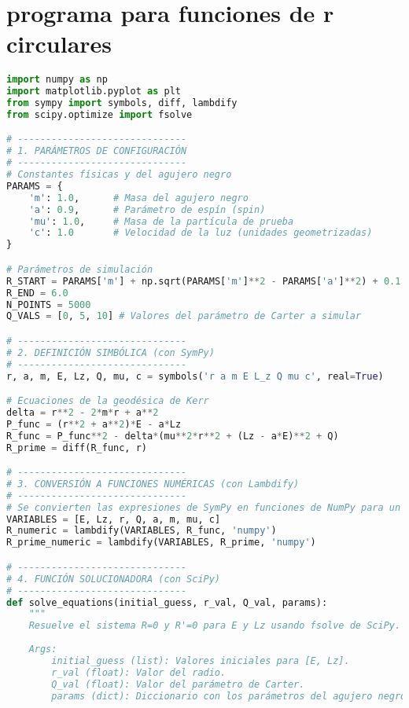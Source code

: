 \section{programa para funciones de r circulares}
\label{chap:programa_orbitas_circulares_kerr}

\begin{lstlisting}[language=Python, caption={Cálculo numérico de las constantes para órbitas circulares en Kerr}, label={lst:kerr_circular_orbits}]
import numpy as np
import matplotlib.pyplot as plt
from sympy import symbols, diff, lambdify
from scipy.optimize import fsolve

# ------------------------------
# 1. PARÁMETROS DE CONFIGURACIÓN
# ------------------------------
# Constantes físicas y del agujero negro
PARAMS = {
    'm': 1.0,      # Masa del agujero negro
    'a': 0.9,      # Parámetro de espín (spin)
    'mu': 1.0,     # Masa de la partícula de prueba
    'c': 1.0       # Velocidad de la luz (unidades geometrizadas)
}

# Parámetros de simulación
R_START = PARAMS['m'] + np.sqrt(PARAMS['m']**2 - PARAMS['a']**2) + 0.1  # Justo fuera del horizonte
R_END = 6.0
N_POINTS = 5000
Q_VALS = [0, 5, 10] # Valores del parámetro de Carter a simular

# ------------------------------
# 2. DEFINICIÓN SIMBÓLICA (con SymPy)
# ------------------------------
r, a, m, E, Lz, Q, mu, c = symbols('r a m E L_z Q mu c', real=True)

# Ecuaciones de la geodésica de Kerr
delta = r**2 - 2*m*r + a**2
P_func = (r**2 + a**2)*E - a*Lz
R_func = P_func**2 - delta*(mu**2*r**2 + (Lz - a*E)**2 + Q)
R_prime = diff(R_func, r)

# ------------------------------
# 3. CONVERSIÓN A FUNCIONES NUMÉRICAS (con Lambdify)
# ------------------------------
# Se convierten las expresiones de SymPy en funciones de NumPy para un cálculo rápido.
VARIABLES = [E, Lz, r, Q, a, m, mu, c]
R_numeric = lambdify(VARIABLES, R_func, 'numpy')
R_prime_numeric = lambdify(VARIABLES, R_prime, 'numpy')

# ------------------------------
# 4. FUNCIÓN SOLUCIONADORA (con SciPy)
# ------------------------------
def solve_equations(initial_guess, r_val, Q_val, params):
    """
    Resuelve el sistema R=0 y R'=0 para E y Lz usando fsolve de SciPy.
    
    Args:
        initial_guess (list): Valores iniciales para [E, Lz].
        r_val (float): Valor del radio.
        Q_val (float): Valor del parámetro de Carter.
        params (dict): Diccionario con los parámetros del agujero negro.
        

\end{lstlisting}
